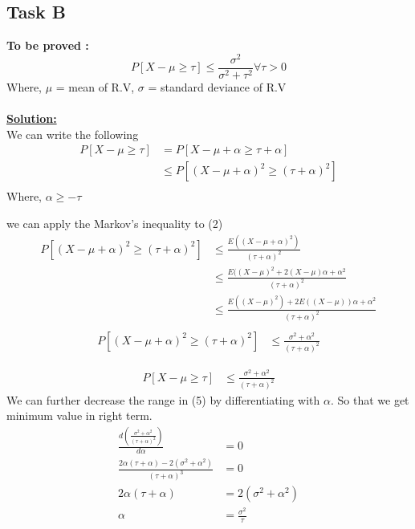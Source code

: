 \documentclass[12pt]{article}
\begin{document}
\subsection{Task B}
\textbf{To be proved :}
\begin{equation}
    P[X-\mu \geq \tau] \leq \frac{\sigma^2}{\sigma^2+\tau^2} \forall \tau > 0
\end{equation}
Where, $\mu$ = mean of R.V, $\sigma$ = standard deviance of R.V \\
\\
\textbf{\underline{Solution:}}\\
We can write the following
\begin{equation}
\begin{split}
    P[X-\mu \geq \tau]& = P[X-\mu+\alpha \geq \tau+\alpha] \\
    & \leq P[(X-\mu+\alpha)^2 \geq (\tau+\alpha)^2] \\
\end{split}
\end{equation}
Where, $\alpha \geq -\tau$

we can apply the Markov's inequality to (2)
\begin{equation}
\begin{split}
    P[(X-\mu+\alpha)^2 \geq (\tau+\alpha)^2]& \leq \frac{E((X-\mu+\alpha)^2)}{(\tau+\alpha)^2} \\
    & \leq \frac{E((X-\mu)^2+2(X-\mu)\alpha+\alpha^2}{(\tau+\alpha)^2} \\
    & \leq \frac{E((X-\mu)^2)+2E((X-\mu))\alpha+\alpha^2}{(\tau+\alpha)^2} \\
\end{split}
\end{equation}
\begin{equation}
\begin{split}
    P[(X-\mu+\alpha)^2 \geq (\tau+\alpha)^2]& \leq \frac{\sigma^2+\alpha^2}{(\tau+\alpha)^2}
\end{split}
\end{equation}

\begin{equation}
\begin{split}
    P[X-\mu \geq \tau]& \leq \frac{\sigma^2+\alpha^2}{(\tau+\alpha)^2}
\end{split}
\end{equation}
We can further decrease the range in (5) by differentiating with $\alpha$. So that we get minimum value in right term.
\begin{equation}
\begin{split}
    \frac{d(\frac{\sigma^2+\alpha^2}{(\tau+\alpha)^2})}{d\alpha}& = 0 \\
    \frac{2\alpha(\tau+\alpha)-2(\sigma^2+\alpha^2)}{(\tau+\alpha)^3}& = 0 \\
    2\alpha(\tau+\alpha)& = 2(\sigma^2+\alpha^2) \\
    \alpha& = \frac{\sigma^2}{\tau}
\end{split}
\end{equation}
\end{document}
